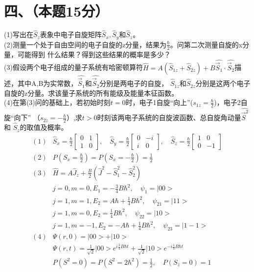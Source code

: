 \documentclass[UTF8]{ctexart}
\begin{document}
\section*{四、（本题15分）}
 (1)写出在$\hat S_z$表象中电子自旋矩阵$\hat S_x,\hat S_y$和$\hat S_z$。\\
(2)测量一个处于自由空间的电子自旋的z分量，结果为$\frac{\hbar}{2}$。问第二次测量自旋的x分量，可能得到
什么结果？得到这些结果的概率是多少？\\
(3)假设两个电子组成的量子系统有哈密顿算符$\hat H=A(\hat S_{1z}+\hat S_{2z})+B\hat{\vec S_1}
  \cdot\hat{\vec S_2}$描述，其中A,B为实常数，$\hat{\vec S_1}$和$\hat{\vec S_2}$分别是两电子的自旋，
$\hat S_{1z}$和$\hat S_{2z}$分别是这两个电子自旋的z分量。求该量子系统的所有能级及能量本征函数。\\
(4)在第(3)问的基础上，若初始时刻$t=0$时，电子1自旋“向上”($s_{1z}=\frac{\hbar}{2}$)，电子2自旋“向下”
（$s_{2z}=-\frac{\hbar}{2}$）,求$t>0$时刻该两电子系统的自旋波函数、总自旋角动量$\hat{\vec S^2}$和
$\hat S_z$的取值及概率。\\
\begin{equation*}
  \begin{aligned}
    (1) & \hat S_x=\frac{\hbar}{2}\begin{bmatrix}
      0 & 1 \\
      1 & 0
    \end{bmatrix},\quad
    \hat S_y=\frac{\hbar}{2}\begin{bmatrix}
      0 & -i \\
      i & 0
    \end{bmatrix},\quad
    \hat S_z=\frac{\hbar}{2}\begin{bmatrix}
      1 & 0  \\
      0 & -1
    \end{bmatrix}                       \\
    (2) & P(S_x=\frac{\hbar}{2})=P(S_x=-\frac{\hbar}{2})=\frac{1}{2}         \\
    (3) & \hat H=A\hat J_z+\frac{B}{2}(\hat J^2-\hat S_1^2-\hat S_2^2)       \\
        & j=0,m=0,E_1=-\frac{3}{4}B\hbar^2,\quad\psi_1=\lvert00>             \\
        & j=1,m=1,E_2=A\hbar+\frac{1}{4}B\hbar^2,\quad\psi_{21}=\lvert11>    \\
        & j=1,m=0,E_2=\frac{1}{4}B\hbar^2,\quad\psi_{22}=\lvert10>           \\
        & j=1,m=-1,E_2=-A\hbar+\frac{1}{4}B\hbar^2,\quad\psi_{23}=\lvert1-1> \\
    (4) & \Psi(r,0)=\lvert00>+\lvert10>                                      \\
        & \Psi(r,t)=\frac{1}{\sqrt2}\lvert00>e^{i\frac{3}{4}B\hbar t}
    +\frac{1}{\sqrt2}\lvert10>e^{-i\frac{1}{4}B\hbar t}                      \\
        & P(S^2=0)=P(S^2=2\hbar^2)=\frac{1}{2},\quad P(S_z=0)=1
  \end{aligned}
\end{equation*}
\end{document}
